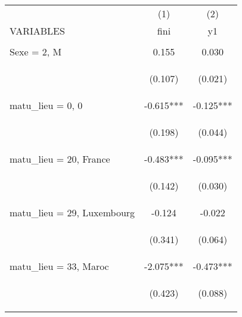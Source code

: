 \begin{center}
\begin{tabular}{lcc} \hline
 & (1) & (2) \\
VARIABLES & fini & y1 \\ \hline
\vspace{4pt} & \begin{footnotesize}\end{footnotesize} & \begin{footnotesize}\end{footnotesize} \\
Sexe = 2, M & 0.155 & 0.030 \\
\vspace{4pt} & \begin{footnotesize}(0.107)\end{footnotesize} & \begin{footnotesize}(0.021)\end{footnotesize} \\
matu\_lieu = 0, 0 & -0.615*** & -0.125*** \\
\vspace{4pt} & \begin{footnotesize}(0.198)\end{footnotesize} & \begin{footnotesize}(0.044)\end{footnotesize} \\
matu\_lieu = 20, France & -0.483*** & -0.095*** \\
\vspace{4pt} & \begin{footnotesize}(0.142)\end{footnotesize} & \begin{footnotesize}(0.030)\end{footnotesize} \\
matu\_lieu = 29, Luxembourg & -0.124 & -0.022 \\
\vspace{4pt} & \begin{footnotesize}(0.341)\end{footnotesize} & \begin{footnotesize}(0.064)\end{footnotesize} \\
matu\_lieu = 33, Maroc & -2.075*** & -0.473*** \\
\vspace{4pt} & \begin{footnotesize}(0.423)\end{footnotesize} & \begin{footnotesize}(0.088)\end{footnotesize} \\

\end{tabular}
\end{center}
